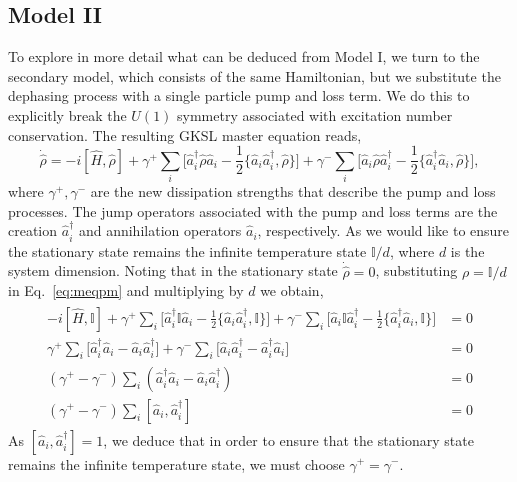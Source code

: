 \subsection{Model II}
\label{subsec:model2}
To explore in more detail what can be deduced from Model I, we turn to the secondary model, which consists of the same Hamiltonian, but we substitute the dephasing process with a single particle pump and loss term. We do this to explicitly break the $U(1)$ symmetry associated with excitation number conservation. The resulting GKSL master equation reads, 
\begin{equation}
\label{eq:meqpm}
    \dot{\hat{\rho}} = -i [\hat{H},\hat{\rho}] + \gamma^+ \sum\limits_i \Big[ \hat{a}^{\dagger}_i \hat{\rho} \hat{a}_i -\frac{1}{2} \{\hat{a}_i\hat{a}^{\dagger}_i, \hat{\rho}\} \Big] + \gamma^- \sum\limits_i \Big[ \hat{a}_i \hat{\rho} \hat{a}^{\dagger}_i -\frac{1}{2} \{\hat{a}^{\dagger}_i\hat{a}_i, \hat{\rho}\}\Big],
\end{equation}
where $\gamma^+, \gamma^-$ are the new dissipation strengths that describe the pump and loss processes. The jump operators associated with the pump and loss terms are the creation $\hat{a}_i^\dagger$ and annihilation operators $\hat{a}_i$, respectively. As we would like to ensure the stationary state remains the infinite temperature state $\mathbb{I}/d$, where $d$ is the system dimension. Noting that in the stationary state $\dot{\hat{\rho}} = 0$, substituting $\rho=
\mathbb{I}/d$ in Eq.~\ref{eq:meqpm} and multiplying by $d$ we obtain, 
\begin{align}
\begin{split}
    -i [\hat{H},\mathbb{I}] + \gamma^+ \sum\limits_i \Big[ \hat{a}^{\dagger}_i \mathbb{I} \hat{a}_i -\frac{1}{2} \{\hat{a}_i\hat{a}^{\dagger}_i, \mathbb{I}\} \Big] + \gamma^- \sum\limits_i \Big[ \hat{a}_i \mathbb{I} \hat{a}^{\dagger}_i -\frac{1}{2} \{\hat{a}^{\dagger}_i\hat{a}_i, \mathbb{I}\}\Big] &= 0\\
    \gamma^+ \sum\limits_i \Big[ \hat{a}^{\dagger}_i \hat{a}_i - \hat{a}_i\hat{a}^{\dagger}_i \Big] + \gamma^- \sum\limits_i \Big[ \hat{a}_i \hat{a}^{\dagger}_i - \hat{a}^{\dagger}_i\hat{a}_i\Big] &= 0 \\
    (\gamma^+-\gamma^-) \sum\limits_i ( \hat{a}^{\dagger}_i\hat{a}_i - \hat{a}_i \hat{a}^{\dagger}_i) &= 0 \\
    (\gamma^+-\gamma^-) \sum\limits_i [\hat{a}_i, \hat{a}^{\dagger}_i] &= 0
\end{split}
\end{align}
As $[\hat{a}_i, \hat{a}^{\dagger}_i] = 1$, we deduce that in order to ensure that the stationary state remains the infinite temperature state, we must choose $\gamma^+ = \gamma^-$. 

